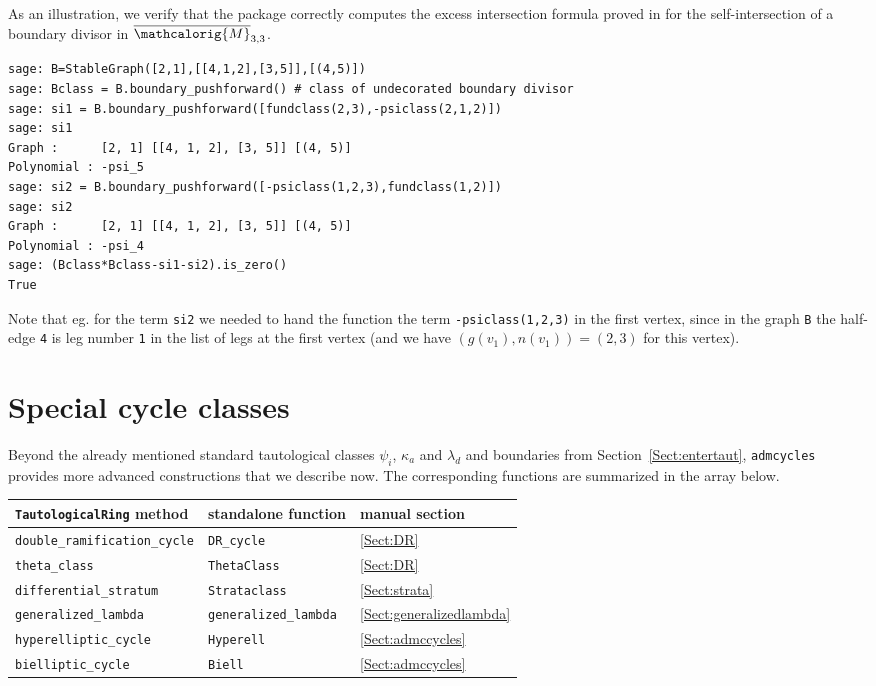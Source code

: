 \documentclass[11pt]{article}
\newcommand{\M}{\ensuremath{\overline{\mathcalorig{M}}}}
\begin{document}
As an illustration, we verify that the package correctly computes the excess intersection formula proved in \cite{Graber2001} for the self-intersection of a boundary divisor in $\M_{3,3}$.
\begin{lstlisting}
sage: B=StableGraph([2,1],[[4,1,2],[3,5]],[(4,5)])
sage: Bclass = B.boundary_pushforward() # class of undecorated boundary divisor
sage: si1 = B.boundary_pushforward([fundclass(2,3),-psiclass(2,1,2)])
sage: si1
Graph :      [2, 1] [[4, 1, 2], [3, 5]] [(4, 5)]
Polynomial : -psi_5
sage: si2 = B.boundary_pushforward([-psiclass(1,2,3),fundclass(1,2)])
sage: si2
Graph :      [2, 1] [[4, 1, 2], [3, 5]] [(4, 5)]
Polynomial : -psi_4
sage: (Bclass*Bclass-si1-si2).is_zero()
True
\end{lstlisting}
Note that eg. for the term \texttt{si2} we needed to hand the function the term \texttt{-psiclass(1,2,3)} in the first vertex, since in the graph \texttt{B} the half-edge \texttt{4} is leg number \texttt{1} in the list of legs at the first vertex (and we have $(g(v_1),n(v_1))=(2,3)$ for this vertex).


\section{Special cycle classes}
Beyond the already mentioned standard tautological classes $\psi_i$, $\kappa_a$ and $\lambda_d$ and boundaries from Section~\ref{Sect:entertaut}, \verb|admcycles| provides more advanced constructions that we describe now. The corresponding functions are summarized in the array below.
\begin{center}\begin{tabular}{lll}
\verb|TautologicalRing| method & standalone function & manual section \\ \hline
\verb|double_ramification_cycle| & \verb|DR_cycle| & \ref{Sect:DR} \\
\verb|theta_class| & \verb|ThetaClass| & \ref{Sect:DR} \\
\verb|differential_stratum| & \verb|Strataclass| & \ref{Sect:strata} \\
\verb|generalized_lambda|  & \verb|generalized_lambda| & \ref{Sect:generalizedlambda} \\
\verb|hyperelliptic_cycle| & \verb|Hyperell| & \ref{Sect:admccycles} \\
\verb|bielliptic_cycle| & \verb|Biell| &  \ref{Sect:admccycles} \\
\end{tabular}\end{center}
\end{document}
